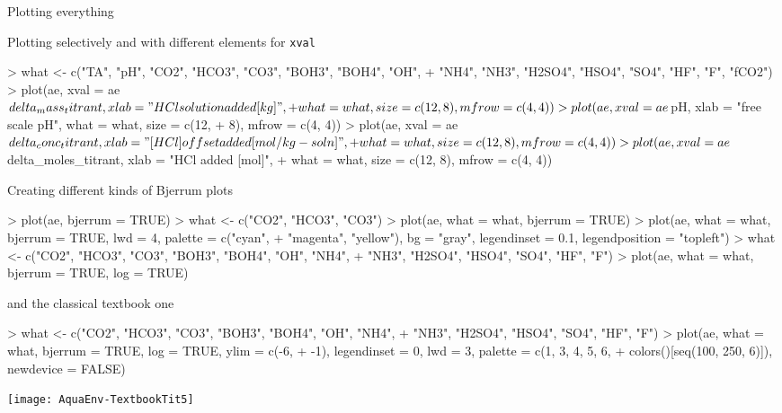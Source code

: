 \documentclass[article,nojss]{jss}
\begin{document}
Plotting everything
\begin{Schunk}
\end{Schunk}

Plotting selectively and with different elements for \texttt{xval}
\begin{Schunk}
\begin{Sinput}
> what <- c("TA", "pH", "CO2", "HCO3", "CO3", "BOH3", "BOH4", "OH", 
+     "NH4", "NH3", "H2SO4", "HSO4", "SO4", "HF", "F", "fCO2")
> plot(ae, xval = ae$delta_mass_titrant, xlab = "HCl solution added [kg]", 
+     what = what, size = c(12, 8), mfrow = c(4, 4))
> plot(ae, xval = ae$pH, xlab = "free scale pH", what = what, size = c(12, 
+     8), mfrow = c(4, 4))
> plot(ae, xval = ae$delta_conc_titrant, xlab = "[HCl] offset added [mol/kg-soln]", 
+     what = what, size = c(12, 8), mfrow = c(4, 4))
> plot(ae, xval = ae$delta_moles_titrant, xlab = "HCl added [mol]", 
+     what = what, size = c(12, 8), mfrow = c(4, 4))
\end{Sinput}
\end{Schunk}



Creating different kinds of Bjerrum plots
\begin{Schunk}
\begin{Sinput}
> plot(ae, bjerrum = TRUE)
> what <- c("CO2", "HCO3", "CO3")
> plot(ae, what = what, bjerrum = TRUE)
> plot(ae, what = what, bjerrum = TRUE, lwd = 4, palette = c("cyan", 
+     "magenta", "yellow"), bg = "gray", legendinset = 0.1, legendposition = "topleft")
> what <- c("CO2", "HCO3", "CO3", "BOH3", "BOH4", "OH", "NH4", 
+     "NH3", "H2SO4", "HSO4", "SO4", "HF", "F")
> plot(ae, what = what, bjerrum = TRUE, log = TRUE)
\end{Sinput}
\end{Schunk}

and the classical textbook one
\begin{Schunk}
\begin{Sinput}
> what <- c("CO2", "HCO3", "CO3", "BOH3", "BOH4", "OH", "NH4", 
+     "NH3", "H2SO4", "HSO4", "SO4", "HF", "F")
> plot(ae, what = what, bjerrum = TRUE, log = TRUE, ylim = c(-6, 
+     -1), legendinset = 0, lwd = 3, palette = c(1, 3, 4, 5, 6, 
+     colors()[seq(100, 250, 6)]), newdevice = FALSE)
\end{Sinput}
\end{Schunk}
\texttt{[image: AquaEnv-TextbookTit5]}
\end{document}
